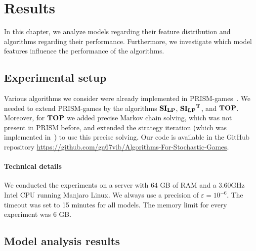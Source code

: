 \chapter{Results} \label{ch:results}

In this chapter, we analyze models regarding their feature distribution and algorithms regarding their performance.
Furthermore, we investigate which model features influence the performance of the algorithms.



\section{Experimental setup}
Various algorithms we consider were already implemented in PRISM-games~\cite{prismgames3}.
We needed to extend PRISM-games by the algorithms $\mathbf{SI_{LP}}$, $\mathbf{\mathbf{SI_{LP}}^T}$, and $\mathbf{TOP}$.
Moreover, for $\mathbf{TOP}$ we added precise Markov chain solving, which was not present in PRISM before, and extended the strategy iteration (which was implemented in~\cite{gandalf20}) to use this precise solving.
Our code is available in the GitHub repository \url{https://github.com/ga67vib/Algorithms-For-Stochastic-Games}.

\subsubsection*{Technical details}
We conducted the experiments on a server with 64 GB of RAM and a 3.60GHz Intel CPU running Manjaro Linux. %
We always use a precision of $\varepsilon=10^{-6}$. The timeout was set to 15 minutes for all models. 
The memory limit for every experiment was 6 GB.

\section{Model analysis results}

